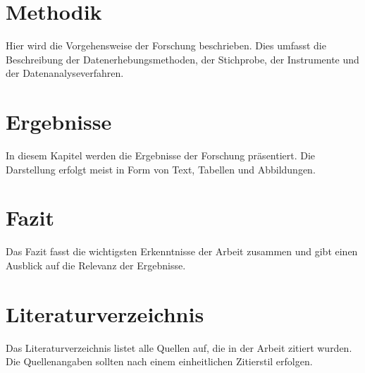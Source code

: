 \section{Methodik}
Hier wird die Vorgehensweise der Forschung beschrieben. Dies umfasst die Beschreibung der Datenerhebungsmethoden, der Stichprobe, der Instrumente und der Datenanalyseverfahren.

\section{Ergebnisse}
In diesem Kapitel werden die Ergebnisse der Forschung präsentiert. Die Darstellung erfolgt meist in Form von Text, Tabellen und Abbildungen.

\section{Fazit}
Das Fazit fasst die wichtigsten Erkenntnisse der Arbeit zusammen und gibt einen Ausblick auf die Relevanz der Ergebnisse.

\section{Literaturverzeichnis}
Das Literaturverzeichnis listet alle Quellen auf, die in der Arbeit zitiert wurden. Die Quellenangaben sollten nach einem einheitlichen Zitierstil erfolgen.
